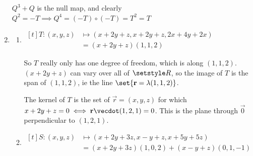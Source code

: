 \documentclass[fleqn,a4paper,11pt]{article}
\begin{document}
\begin{enumerate}[label=\textbf{\arabic*.}]
    \(Q^3 + Q\) is the null map, and clearly
    \(Q^2 = -T \implies Q^4 = (-T) \circ (-T) = T^2 = T\)
   \item
    \begin{enumerate}[label=(\alph*)]
     \item \(
      \begin{aligned}[t]
       T : (x, y, z) &\mapsto (x + 2y + z, x + 2y + z, 2x + 4y + 2x) \\
                     &= (x + 2y + z)(1, 1, 2)
      \end{aligned} \)

      So \(T\) really only has one degree of freedom, which is along
      \((1, 1, 2)\). \((x + 2y + z)\) can vary over all of \(\Reals\), so the
      image of \(T\) is the span of \((1, 1, 2)\), ie the line
      \(\set{\vec r = \lambda (1, 1, 2)}\).

      The kernel of \(T\) is the set of \(\vec r = (x, y, z)\) for which
      \(x + 2y + z = 0 \iff \vec r \vecdot (1, 2, 1) = 0\). This is the plane
      through \(\vec 0\) perpendicular to \((1, 2, 1)\).
     \item \(
      \begin{aligned}[t]
       S: (x, y, z) &\mapsto (x + 2y + 3z, x - y + z, x + 5y + 5z) \\
                    &= (x + 2y + 3z)(1, 0, 2) + (x - y + z)(0, 1, -1)
      \end{aligned} \)


\end{enumerate}
\end{enumerate}
\end{document}
